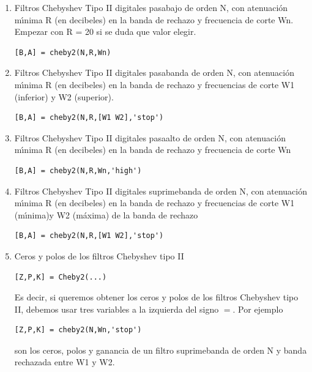 \begin{enumerate}
\begin{enumerate}
                \item   Filtros Chebyshev Tipo II digitales pasabajo de orden N, con atenuaci\'{o}n
                        m\'{\i}nima R (en decibeles) en la banda de rechazo  y frecuencia de corte Wn.
                        Empezar con R = 20 si se duda que valor elegir.
\begin{verbatim}
[B,A] = cheby2(N,R,Wn)
\end{verbatim}
                
                \item   Filtros Chebyshev Tipo II digitales pasabanda de orden N, con atenuaci\'{o}n
                        m\'{\i}nima R (en decibeles) en la banda de rechazo y frecuencias de corte W1
                        (inferior) y W2  (superior).
\begin{verbatim}
[B,A] = cheby2(N,R,[W1 W2],'stop')
\end{verbatim}
                
                \item   Filtros Chebyshev Tipo II digitales pasaalto de orden N, con atenuaci\'{o}n
                        m\'{\i}nima R (en decibeles) en la banda de rechazo y  frecuencia de corte Wn
\begin{verbatim}
[B,A] = cheby2(N,R,Wn,'high')
\end{verbatim}
                
                \item   Filtros Chebyshev Tipo II digitales suprimebanda de orden N, con atenuaci\'{o}n
                        m\'{\i}nima R (en decibeles) en la banda de rechazo y frecuencias de corte W1
                        (m\'{\i}nima)y W2 (m\'{a}xima) de la banda de rechazo
\begin{verbatim}
[B,A] = cheby2(N,R,[W1 W2],'stop')
\end{verbatim}

                \item   Ceros y polos de los filtros Chebyshev tipo II
\begin{verbatim}
[Z,P,K] = Cheby2(...)
\end{verbatim}
             Es decir, si queremos obtener los ceros y polos de los filtros Chebyshev tipo II, debemos usar
             tres variables a la izquierda del signo $=$. Por ejemplo
\begin{verbatim}
[Z,P,K] = cheby2(N,Wn,'stop')
\end{verbatim}
             son los ceros, polos y ganancia de un filtro suprimebanda de orden N y banda rechazada entre
             W1 y W2.


\end{enumerate}
\end{enumerate}
